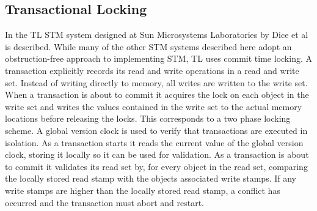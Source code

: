 \subsection{Transactional Locking }
In \cite{dice2006transactional} the TL \ac{STM} system designed at Sun Microsystems Laboratories by Dice et al is described. While many of the other \ac{STM} systems described here adopt an obstruction-free approach to implementing \ac{STM}, TL uses commit time locking\cite[p. 199]{dice2006transactional}. A transaction explicitly records its read and write operations in a read and write set\cite[p. 198]{dice2006transactional}. Instead of writing directly to memory, all writes are written to the write set. When a transaction is about to commit it acquires the lock on each object in the write set and writes the values contained in the write set to the actual memory locations before releasing the locks\cite[p. 200]{dice2006transactional}. This corresponds to a two phase locking scheme\cite[p. 455]{tanenbaum2008modern}. A global version clock is used to verify that transactions are executed in isolation\cite[p. 201]{dice2006transactional}. As a transaction starts it reads the current value of the global version clock, storing it locally so it can be used for validation. As a transaction is about to commit it validates its read set by, for every object in the read set, comparing the locally stored read stamp with the objects associated write stamps\cite[p. 200]{dice2006transactional}. If any write stamps are higher than the locally stored read stamp, a conflict has occurred and the transaction must abort and restart. 

